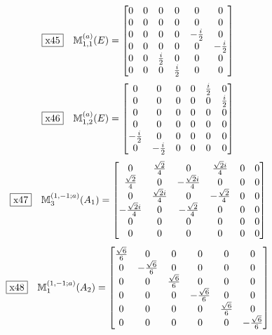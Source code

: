 \documentclass[fleqn,10pt,landscape]{jsarticle}
\begin{document}
\begin{dmath*}
\fbox{x45}\quad \mathbb{M}_{1,1}^{(a)}(E)=\begin{bmatrix} 0 & 0 & 0 & 0 & 0 & 0 \\ 0 & 0 & 0 & 0 & 0 & 0 \\ 0 & 0 & 0 & 0 & - \frac{i}{2} & 0 \\ 0 & 0 & 0 & 0 & 0 & - \frac{i}{2} \\ 0 & 0 & \frac{i}{2} & 0 & 0 & 0 \\ 0 & 0 & 0 & \frac{i}{2} & 0 & 0 \end{bmatrix}
\end{dmath*}
\begin{dmath*}
\fbox{x46}\quad \mathbb{M}_{1,2}^{(a)}(E)=\begin{bmatrix} 0 & 0 & 0 & 0 & \frac{i}{2} & 0 \\ 0 & 0 & 0 & 0 & 0 & \frac{i}{2} \\ 0 & 0 & 0 & 0 & 0 & 0 \\ 0 & 0 & 0 & 0 & 0 & 0 \\ - \frac{i}{2} & 0 & 0 & 0 & 0 & 0 \\ 0 & - \frac{i}{2} & 0 & 0 & 0 & 0 \end{bmatrix}
\end{dmath*}
\begin{dmath*}
\fbox{x47}\quad \mathbb{M}_{3}^{(1,-1;a)}(A_{1})=\begin{bmatrix} 0 & \frac{\sqrt{2}}{4} & 0 & \frac{\sqrt{2} i}{4} & 0 & 0 \\ \frac{\sqrt{2}}{4} & 0 & - \frac{\sqrt{2} i}{4} & 0 & 0 & 0 \\ 0 & \frac{\sqrt{2} i}{4} & 0 & - \frac{\sqrt{2}}{4} & 0 & 0 \\ - \frac{\sqrt{2} i}{4} & 0 & - \frac{\sqrt{2}}{4} & 0 & 0 & 0 \\ 0 & 0 & 0 & 0 & 0 & 0 \\ 0 & 0 & 0 & 0 & 0 & 0 \end{bmatrix}
\end{dmath*}
\begin{dmath*}
\fbox{x48}\quad \mathbb{M}_{1}^{(1,-1;a)}(A_{2})=\begin{bmatrix} \frac{\sqrt{6}}{6} & 0 & 0 & 0 & 0 & 0 \\ 0 & - \frac{\sqrt{6}}{6} & 0 & 0 & 0 & 0 \\ 0 & 0 & \frac{\sqrt{6}}{6} & 0 & 0 & 0 \\ 0 & 0 & 0 & - \frac{\sqrt{6}}{6} & 0 & 0 \\ 0 & 0 & 0 & 0 & \frac{\sqrt{6}}{6} & 0 \\ 0 & 0 & 0 & 0 & 0 & - \frac{\sqrt{6}}{6} \end{bmatrix}
\end{dmath*}
\end{document}
